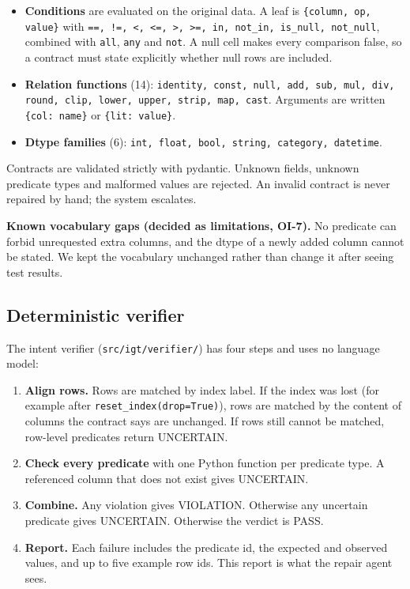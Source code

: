\documentclass[11pt]{article}
\providecommand{\tightlist}{\setlength{\itemsep}{0pt}\setlength{\parskip}{0pt}}
\begin{document}
\begin{itemize}
\tightlist
\item
  \textbf{Conditions} are evaluated on the original data. A leaf is
  \texttt{\{column, op, value\}} with
  \texttt{==, !=, <, <=, >, >=, in, not\_\allowbreak{}in, is\_\allowbreak{}null, not\_\allowbreak{}null},
  combined with \texttt{all}, \texttt{any} and \texttt{not}. A null cell
  makes every comparison false, so a contract must state explicitly
  whether null rows are included.
\item
  \textbf{Relation functions} (14):
  \texttt{identity, const, null, add, sub, mul, div, round, clip, lower, upper, strip, map, cast}.
  Arguments are written \texttt{\{col: name\}} or
  \texttt{\{lit: value\}}.
\item
  \textbf{Dtype families} (6):
  \texttt{int, float, bool, string, category, datetime}.
\end{itemize}

Contracts are validated strictly with pydantic. Unknown fields, unknown
predicate types and malformed values are rejected. An invalid contract
is never repaired by hand; the system escalates.

\textbf{Known vocabulary gaps (decided as limitations, OI-7).} No
predicate can forbid unrequested extra columns, and the dtype of a newly
added column cannot be stated. We kept the vocabulary unchanged rather
than change it after seeing test results.

\subsection{Deterministic verifier}

The intent verifier
(\texttt{src/\allowbreak{}igt/\allowbreak{}verifier/\allowbreak{}}) has
four steps and uses no language model:

\begin{enumerate}
\def\labelenumi{\arabic{enumi}.}
\tightlist
\item
  \textbf{Align rows.} Rows are matched by index label. If the index was
  lost (for example after
  \texttt{reset\_\allowbreak{}index(drop=True)}), rows are matched by
  the content of columns the contract says are unchanged. If rows still
  cannot be matched, row-level predicates return UNCERTAIN.
\item
  \textbf{Check every predicate} with one Python function per predicate
  type. A referenced column that does not exist gives UNCERTAIN.
\item
  \textbf{Combine.} Any violation gives VIOLATION. Otherwise any
  uncertain predicate gives UNCERTAIN. Otherwise the verdict is PASS.
\item
  \textbf{Report.} Each failure includes the predicate id, the expected
  and observed values, and up to five example row ids. This report is
  what the repair agent sees.
\end{enumerate}
\end{document}

